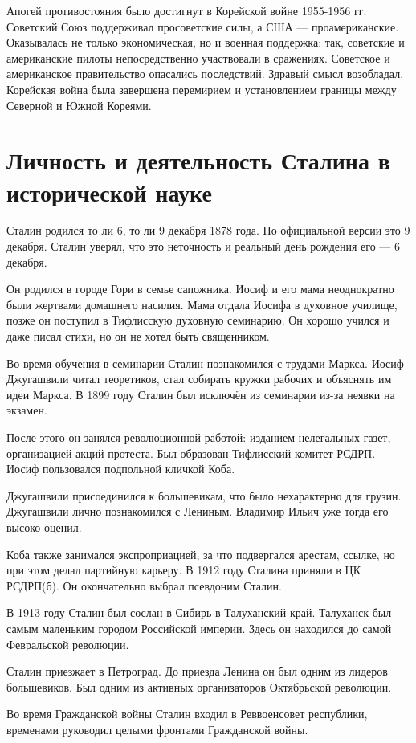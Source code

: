 \documentclass{article}
\begin{document}
Апогей противостояния было достигнут в Корейской войне 1955-1956 гг. Советский Союз поддерживал просоветские силы, а США --- проамериканские. Оказывалась не только экономическая, но и военная поддержка: так, советские и американские пилоты непосредственно участвовали в сражениях. Советское и американское правительство опасались последствий. Здравый смысл возобладал. Корейская война была завершена перемирием и установлением границы между Северной и Южной Кореями.

\section{Личность и деятельность Сталина в исторической науке}
Сталин родился то ли 6, то ли 9 декабря 1878 года. По официальной версии это 9 декабря. Сталин уверял, что это неточность и реальный день рождения его --- 6 декабря.

Он родился в городе Гори в семье сапожника. Иосиф и его мама неоднократно были жертвами домашнего насилия. Мама отдала Иосифа в духовное училище, позже он поступил в Тифлисскую духовную семинарию. Он хорошо учился и даже писал стихи, но он не хотел быть священником.

Во время обучения в семинарии Сталин познакомился с трудами Маркса. Иосиф Джугашвили читал теоретиков, стал собирать кружки рабочих и объяснять им идеи Маркса. В 1899 году Сталин был исключён из семинарии из-за неявки на экзамен.

После этого он занялся революционной работой: изданием нелегальных газет, организацией акций протеста. Был образован Тифлисский комитет РСДРП. Иосиф пользовался подпольной кличкой Коба.

Джугашвили присоединился к большевикам, что было нехарактерно для грузин. Джугашвили лично познакомился с Лениным. Владимир Ильич уже тогда его высоко оценил.

Коба также занимался экспроприацией, за что подвергался арестам, ссылке, но при этом делал партийную карьеру. В 1912 году Сталина приняли в ЦК РСДРП(б). Он окончательно выбрал псевдоним Сталин.

В 1913 году Сталин был сослан в Сибирь в Талуханский край. Талуханск был самым маленьким городом Российской империи. Здесь он находился до самой Февральской революции.

Сталин приезжает в Петроград. До приезда Ленина он был одним из лидеров большевиков. Был одним из активных организаторов Октябрьской революции.

Во время Гражданской войны Сталин входил в Реввоенсовет республики, временами руководил целыми фронтами Гражданской войны.
\end{document}
